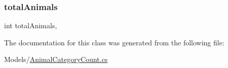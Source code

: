 \subsubsection{\texorpdfstring{total\+Animals}{totalAnimals}}
{\footnotesize\ttfamily int total\+Animals\hspace{0.3cm}{\ttfamily [get]}, {\ttfamily [set]}}



The documentation for this class was generated from the following file\+:\begin{DoxyCompactItemize}
\item 
Models/\hyperlink{AnimalCategoryCount_8cs}{Animal\+Category\+Count.\+cs}\end{DoxyCompactItemize}
